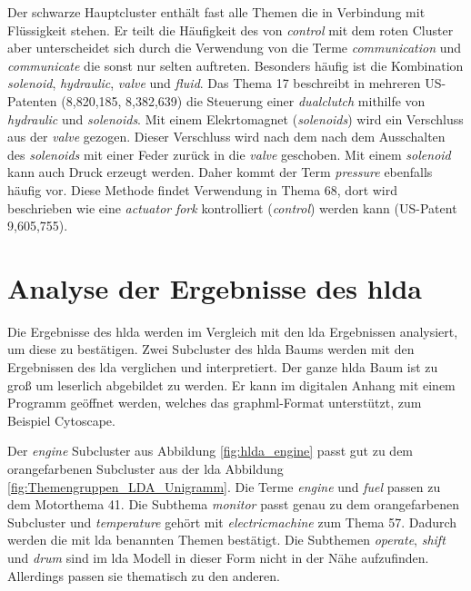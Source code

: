 Der schwarze Hauptcluster enthält fast alle Themen die in Verbindung mit Flüssigkeit stehen. Er teilt die Häufigkeit des von \emph{control} mit dem roten Cluster aber unterscheidet sich durch die Verwendung von die Terme \emph{communication} und \emph{communicate} die sonst nur selten auftreten. Besonders häufig ist die Kombination \emph{solenoid}, \emph{hydraulic}, \emph{valve} und \emph{fluid}. Das Thema 17 beschreibt in mehreren US-Patenten (8,820,185, 8,382,639) die Steuerung einer \emph{dualclutch} mithilfe von \emph{hydraulic} und \emph{solenoids}. Mit einem Elekrtomagnet (\emph{solenoids}) wird ein Verschluss aus der \emph{valve} gezogen. Dieser Verschluss wird nach dem nach dem Ausschalten des \emph{solenoids} mit einer Feder zurück in die \emph{valve} geschoben. Mit einem \emph{solenoid} kann auch Druck erzeugt werden. Daher kommt der Term \emph{pressure} ebenfalls häufig vor. Diese Methode findet Verwendung in Thema 68, dort wird beschrieben wie eine \emph{actuator} \emph{fork} kontrolliert (\emph{control}) werden kann (US-Patent 9,605,755).
 
 
 
 
 
 
 
 


\section{Analyse der Ergebnisse des \gls{hlda}}

Die Ergebnisse des \gls{hlda} werden im Vergleich mit den \gls{lda} Ergebnissen analysiert, um diese zu bestätigen. Zwei Subcluster des \gls{hlda} Baums werden mit den Ergebnissen des \gls{lda} verglichen und interpretiert. Der ganze \gls{hlda} Baum ist zu groß um leserlich abgebildet zu werden. Er kann im digitalen Anhang mit einem Programm geöffnet werden, welches das graphml-Format unterstützt, zum Beispiel Cytoscape.


Der \emph{engine} Subcluster aus Abbildung \ref{fig:hlda_engine} passt gut zu dem orangefarbenen Subcluster aus der \gls{lda} Abbildung \ref{fig:Themengruppen_LDA_Unigramm}. Die Terme \emph{engine} und \emph{fuel} passen zu dem Motorthema 41. Die Subthema \emph{monitor} passt genau zu dem orangefarbenen Subcluster und \emph{temperature} gehört mit \emph{electricmachine} zum Thema 57. Dadurch werden die mit \gls{lda} benannten Themen bestätigt. Die Subthemen \emph{operate}, \emph{shift} und \emph{drum} sind im \gls{lda} Modell in dieser Form nicht in der Nähe aufzufinden. Allerdings passen sie thematisch zu den anderen.

